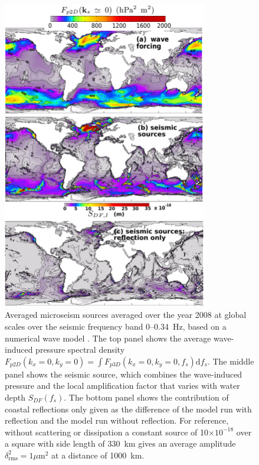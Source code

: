 \begin{figure}
\centerline{\includegraphics[width=0.8\textwidth]{FIGS_CH_SISMO/mean_sources_ref_noref_nobug.pdf}}
  \caption{Averaged microseism sources averaged over the year 2008 at global scales over the seismic frequency band 0--0.34~Hz, based on a numerical wave model 
\citep{Ardhuin&al.2011}. The top panel shows the average wave-induced pressure spectral density  
$F_{p2D}(k_x=0,k_y=0)=\int F_{p3D}(k_x=0,k_y=0,f_s) {\mathrm d}f_s$. The middle panel shows the seismic source, which combines the wave-induced pressure 
and the local amplification factor that varies with water depth
$S_{DF}(f_s)$. The bottom panel shows the contribution of coastal reflections only given as the difference of the model run with reflection and the model run without 
reflection. For reference, without scattering or dissipation a constant source of 10$\times 10^{-18}$ over a square with side length of 330~km gives 
an average amplitude $\delta_{\mathrm{rms}}^2=1\mu$m$^2$ at a distance of  1000~km.}
\label{fig:sismo_source}
\end{figure}

